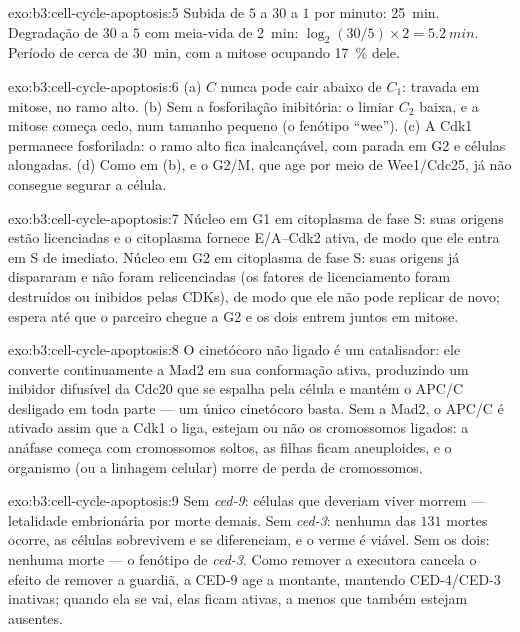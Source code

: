 \begin{solution}{exo:b3:cell-cycle-apoptosis:5}
Subida de $5$ a $30$ a $1$ por minuto: \qty{25}{min}. Degradação de
$30$ a $5$ com meia-vida de \qty{2}{min}: $\log_{2}(30/5)\times 2 =
\qty{5.2}{min}$. Período de cerca de \qty{30}{min}, com a mitose
ocupando \qty{17}{\%} dele.
\end{solution}

\begin{solution}{exo:b3:cell-cycle-apoptosis:6}
(a) $C$ nunca pode cair abaixo de $C_{1}$: travada em mitose, no ramo
alto. (b) Sem a fosforilação inibitória: o limiar $C_{2}$ baixa, e a
mitose começa cedo, num tamanho pequeno (o fenótipo ``wee''). (c) A
Cdk1 permanece fosforilada: o ramo alto fica inalcançável, com parada
em G2 e células alongadas. (d) Como em (b), e o  G2/M,
que age por meio de Wee1/Cdc25, já não consegue segurar a célula.
\end{solution}

\begin{solution}{exo:b3:cell-cycle-apoptosis:7}
Núcleo em G1 em citoplasma de fase S: suas origens estão licenciadas e
o citoplasma fornece  E/A--Cdk2 ativa, de modo que ele entra em
S de imediato. Núcleo em G2 em citoplasma de fase S: suas origens já
dispararam e não foram relicenciadas (os fatores de licenciamento foram
destruídos ou inibidos pelas CDKs), de modo que ele não pode replicar
de novo; espera até que o parceiro chegue a G2 e os dois entrem juntos
em mitose.
\end{solution}

\begin{solution}{exo:b3:cell-cycle-apoptosis:8}
O cinetócoro não ligado é um catalisador: ele converte continuamente a
Mad2 em sua conformação ativa, produzindo um inibidor difusível da
Cdc20 que se espalha pela célula e mantém o APC/C desligado em toda
parte --- um único cinetócoro basta. Sem a Mad2, o APC/C é ativado
assim que a Cdk1 o liga, estejam ou não os cromossomos ligados: a
anáfase começa com cromossomos soltos, as filhas ficam aneuploides, e o
organismo (ou a linhagem celular) morre de perda de cromossomos.
\end{solution}

\begin{solution}{exo:b3:cell-cycle-apoptosis:9}
Sem \emph{ced-9}: células que deveriam viver morrem --- letalidade
embrionária por morte demais. Sem \emph{ced-3}: nenhuma das $131$
mortes ocorre, as células sobrevivem e se diferenciam, e o verme é
viável. Sem os dois: nenhuma morte --- o fenótipo de \emph{ced-3}. Como
remover a executora cancela o efeito de remover a guardiã, a CED-9 age
a montante, mantendo CED-4/CED-3 inativas; quando ela se vai, elas
ficam ativas, a menos que também estejam ausentes.
\end{solution}


